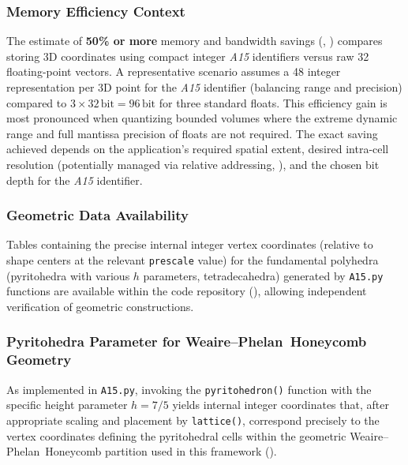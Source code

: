 \documentclass[10pt]{article}
\def\AAAB{\textit{A15}}
\def\WP{Weaire--Phelan}
\def\WPH{\WP{}~Honeycomb}
\begin{document}
\subsubsection{Memory Efficiency Context}\label{subsubsec-notes-memory}
The estimate of \textbf{50\% or more} memory and bandwidth savings (, ) compares storing 3D coordinates using compact integer \AAAB{} identifiers versus raw \SI{32}{\bit} floating-point vectors. A representative scenario assumes a \SI{48}{\bit} integer representation per 3D point for the \AAAB{} identifier (balancing range and precision) compared to $3 \times 32\,\text{bit} = 96\,\text{bit}$ for three standard floats. This efficiency gain is most pronounced when quantizing bounded volumes where the extreme dynamic range and full mantissa precision of floats are not required. The exact saving achieved depends on the application's required spatial extent, desired intra-cell resolution (potentially managed via relative addressing, ), and the chosen bit depth for the \AAAB{} identifier.

\subsubsection{Geometric Data Availability}\label{subsubsec-notes-geometry}
Tables containing the precise internal integer vertex coordinates (relative to shape centers at the relevant \texttt{prescale} value) for the fundamental polyhedra (pyritohedra with various $h$ parameters, tetradecahedra) generated by \texttt{A15.py} functions are available within the code repository (), allowing independent verification of geometric constructions.

\subsubsection{Pyritohedra Parameter for \WPH{} Geometry}\label{subsubsec-notes-h75}
As implemented in \texttt{A15.py}, invoking the \texttt{pyritohedron()} function with the specific height parameter $h=7/5$ yields internal integer coordinates that, after appropriate scaling and placement by \texttt{lattice()}, correspond precisely to the vertex coordinates defining the pyritohedral cells within the geometric \WPH{} partition used in this framework ().
\end{document}
